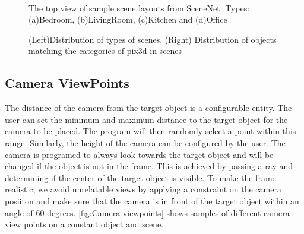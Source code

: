 \begin{figure}[!ht]
    \centering
    \quad
    \\
    \quad
    \caption{The top view of sample scene layouts from SceneNet. Types: (a)Bedroom, (b)LivingRoom, (c)Kitchen and (d)Office}
    \label{fig:Scene Types}
\end{figure}


\begin{figure}[!ht]
    \resizebox{0.49\textwidth}{6cm}{}
    \resizebox{0.49\textwidth}{6cm}{}
    \caption{(Left)Distribution of types of scenes, (Right) Distribution of objects matching the categories of pix3d in scenes}
    \label{fig:distribution of scenes}
\end{figure}


\subsection{Camera ViewPoints}\label{subsec:camera-viewpoints}

The distance of the camera from the target object is a configurable entity.
The user can set the minimum and maximum distance to the target object for the camera to be placed.
The program will then randomly select a point within this range.
Similarly, the height of the camera can be configured by the user.
The camera is programed to always look towards the target object and will be changed if the object is not in the frame.
This is achieved by passing a ray and determining if the center of the target object is visible.
To make the frame realistic, we avoid unrelatable views by applying a constraint on the camera posiiton and make sure that the camera is in front of the target object within an angle of 60 degrees.
\autoref{fig:Camera viewpoints} shows samples of different camera view points on a constant object and scene.

